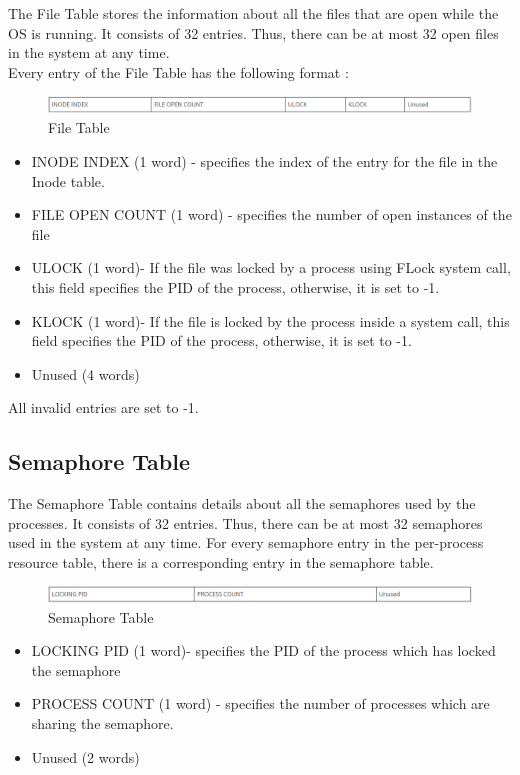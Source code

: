 The File Table stores the information about all the files that are open while the OS is running. It consists of 32 entries. Thus, there can be at most 32 open files in the system at any time.
\\
Every entry of the File Table has the following format :
\begin{figure}[ht]
\centering
\includegraphics  [scale=0.55]{figures/ft.png}
\caption{\footnotesize File Table}
\end{figure}

\begin {itemize}

\item INODE INDEX (1 word) - specifies the index of the entry for the file in the Inode table.
\item FILE OPEN COUNT (1 word) - specifies the number of open instances of the file
\item ULOCK (1 word)- If the file was locked by a process using FLock system call, this field specifies the PID of the process, otherwise, it is set to -1.
\item KLOCK (1 word)- If the file is locked by the process inside a system call, this field specifies the PID of the process, otherwise, it is set to -1.
\item Unused (4 words)

\end {itemize}
All invalid entries are set to -1.

\subsection {Semaphore Table}

The Semaphore Table contains details about all the semaphores used by the processes. It consists of 32 entries. Thus, there can be at most 32 semaphores used in the system at any time. For every semaphore entry in the per-process resource table, there is a corresponding entry in the semaphore table.
\\
\begin{figure}[ht]
\centering
\includegraphics  [scale=0.55]{figures/st.png}
\caption{\footnotesize Semaphore Table}
\end{figure}

\begin {itemize}

\item LOCKING PID (1 word)- specifies the PID of the process which has locked the semaphore
\item PROCESS COUNT (1 word) - specifies the number of processes which are sharing the semaphore.
\item Unused (2 words)
\end {itemize}

